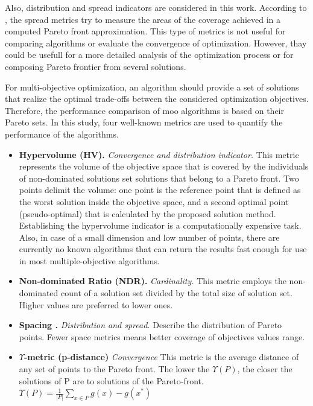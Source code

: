             Also, distribution and spread indicators are considered in this work. According to \cite{CustodioMVV11}, the spread metrics try to measure the areas of the coverage achieved in a computed Pareto front approximation. This type of metrics is not useful for comparing algorithms or evaluate the convergence of optimization. However, thay could be usefull for a more detailed analysis of the optimization process or for composing Pareto frontier from several solutions.

            For multi-objective optimization, an algorithm should provide a set of solutions that realize the optimal trade-offs between the considered optimization objectives. Therefore, the performance comparison of \gls{moo} algorithms is based on their Pareto sets. In this study, four well-known metrics are used to quantify the performance of the algorithms.
            \begin{itemize}
                \item \textbf{Hypervolume (HV).}\cite{Zitzler2000ComparisonOM} \textit{Convergence and distribution indicator.}
                This metric represents the volume of the objective space that is covered by the individuals of non-dominated solutions set solutions that belong to a Pareto front. Two points delimit the volume: one point is the reference point that is defined as the worst solution inside the objective space, and a second optimal point (pseudo-optimal) that is calculated by the proposed solution method. Establishing the hypervolume indicator is a computationally expensive task. Also, in case of a small dimension and low number of points, there are currently no known algorithms that can return the results fast enough for use in most multiple-objective algorithms.  
                \item \textbf{Non-dominated Ratio (NDR).} \textit{Cardinality.} This metric employs the non-dominated count of a solution set divided by the total size of solution set. Higher values are preferred to lower ones.
                \item \textbf{Spacing \cite{Schott1995FaultTD}.} \textit{Distribution and spread.} Describe the distribution of Pareto points. Fewer space metrics means better coverage of objectives values range. 
                \item \textbf{$\Upsilon$-metric (p-distance)}\cite{Martens13} \textit{Convergence} This metric is the average distance of any set of points to the Pareto front. The lower the $\Upsilon (P)$, the closer the solutions of P are to solutions of the Pareto-front. $\Upsilon(P) = \frac{1}{|P|}\sum_{x\in P}g(x)-g(x^*)$  
            \end{itemize}
 
